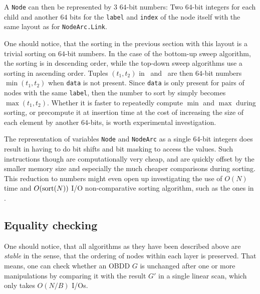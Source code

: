 A \lstinline{Node} can then be represented by $3$ $64$-bit numbers: Two $64$-bit
integers for each child and another $64$ bits for the \lstinline{label} and
\lstinline{index} of the node itself with the same layout as for
\lstinline{NodeArc.Link}.

One should notice, that the sorting in the previous section with this layout is
a trivial sorting on $64$-bit numbers. In the case of the bottom-up sweep
algorithm, the sorting is in descending order, while the top-down sweep
algorithms use a sorting in ascending order. Tuples $(t_1,t_2)$ in \Apply\ and
\Equal\ are then $64$-bit numbers $\min(t_1,t_2)$ when \lstinline{data} is not
present. Since \lstinline{data} is only present for pairs of nodes with the same
\lstinline{label}, then the number to sort by simply becomes $\max(t_1,t_2)$.
Whether it is faster to repeatedly compute $\min$ and $\max$ during sorting, or
precompute it at insertion time at the cost of increasing the size of each
element by another $64$-bits, is worth experimental investigation.

The representation of variables \lstinline{Node} and \lstinline{NodeArc} as a
single $64$-bit integers does result in having to do bit shifts and bit masking
to access the values. Such instructions though are computationally very cheap,
and are quickly offset by the smaller memory size and especially the much
cheaper comparisons during sorting. This reduction to numbers might even open up
investigating the use of $O(N)$ time and $O(\text{sort}(N))$ I/O non-comparative sorting
algorithm, such as the ones in \todocite.

\subsection{Equality checking}
One should notice, that all algorithms as they have been described above are
\emph{stable} in the sense, that the ordering of nodes within each layer is
preserved. That means, one can check whether an OBDD $G$ is unchanged after one
or more manipulations by comparing it with the result $G'$ in a single linear
scan, which only takes $O(N/B)$ I/Os.



